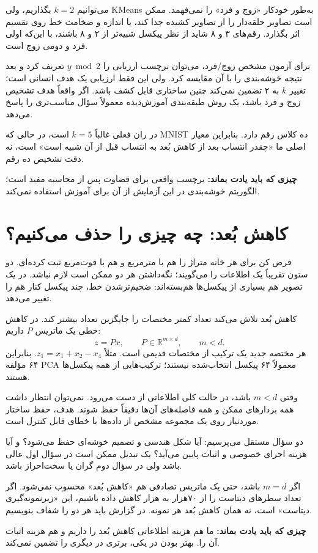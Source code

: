 \documentclass[11pt,a4paper]{article}
\newcommand{\lesson}[1]{\clearpage\section{#1}}
\newcommand{\takeaway}[1]{\par\textbf{چیزی که باید یادت بماند:} #1\par}
\begin{document}
می‌توانیم \(k=2\) بگذاریم، ولی KMeans به‌طور خودکار «زوج و فرد» را نمی‌فهمد. ممکن است تصاویر حلقه‌دار را از تصاویر کشیده جدا کند، یا اندازه و ضخامت خط روی تقسیم اثر بگذارد. رقم‌های ۳ و ۸ شاید از نظر پیکسل شبیه‌تر از ۲ و ۸ باشند، با این‌که اولی فرد و دومی زوج است.

برای آزمون مشخص زوج/فرد، می‌توان برچسب ارزیابی را \(y\bmod2\) تعریف کرد و بعد نتیجه خوشه‌بندی را با آن مقایسه کرد. ولی این فقط ارزیابی یک هدف انسانی است؛ تغییر \(k\) به ۲ تضمین نمی‌کند چنین ساختاری قابل کشف باشد. اگر واقعاً هدف تشخیص زوج و فرد باشد، یک روش طبقه‌بندی آموزش‌دیده معمولاً سؤال مناسب‌تری را پاسخ می‌دهد.

در ران فعلی غالباً \(k=5\) است، در حالی که MNIST ده کلاس رقم دارد. بنابراین معیار اصلی ما «چقدر انتساب بعد از کاهش بُعد به انتساب قبل از آن شبیه است» است، نه دقت تشخیص ده رقم.

\takeaway{برچسب واقعی برای قضاوت پس از محاسبه مفید است؛ الگوریتم خوشه‌بندی در این آزمایش از آن برای آموزش استفاده نمی‌کند.}

\lesson{کاهش بُعد: چه چیزی را حذف می‌کنیم؟}
فرض کن برای هر خانه متراژ را هم با مترمربع و هم با فوت‌مربع ثبت کرده‌ای. دو ستون تقریباً یک اطلاعات را می‌گویند؛ نگه‌داشتن هر دو ممکن است لازم نباشد. در یک تصویر هم بسیاری از پیکسل‌ها هم‌بسته‌اند: ضخیم‌ترشدن خط، چند پیکسل کنار هم را تغییر می‌دهد.

کاهش بُعد تلاش می‌کند تعداد کمتر مختصات را جایگزین تعداد بیشتر کند. در کاهش خطی یک ماتریس \(P\) داریم:
\[
 z=Px,\qquad P\in\mathbb{R}^{m\times d},\qquad m<d.
\]
هر مختصه جدید یک ترکیب از مختصات قدیمی است. مثلاً \(z_1=x_1+x_2-x_4\). بنابراین ۶۴ مؤلفه PCA معمولاً ۶۴ پیکسل انتخاب‌شده نیستند؛ ترکیب‌هایی از همه پیکسل‌ها هستند.

وقتی \(m<d\) باشد، در حالت کلی اطلاعاتی از دست می‌رود. نمی‌توان انتظار داشت همه بردارهای ممکن و همه فاصله‌های آن‌ها دقیقاً حفظ شوند. هدف، حفظ ساختار موردنیاز روی یک مجموعه مشخص از داده‌ها با خطای قابل کنترل است.

دو سؤال مستقل می‌پرسیم: آیا شکل هندسی و تصمیم خوشه‌ای حفظ می‌شود؟ و آیا هزینه اجرای خصوصی و اثبات پایین می‌آید؟ یک تبدیل ممکن است در سؤال اول عالی باشد ولی در سؤال دوم گران یا سخت‌احراز باشد.

اگر \(m=d\) باشد، حتی یک ماتریس تصادفی هم «کاهش بُعد» محسوب نمی‌شود. اگر تعداد سطرهای دیتاست را از ۷۰هزار به هزار کاهش داده باشیم، این «زیرنمونه‌گیری دیتاست» است، نه همان کاهش بُعد هر نمونه. در گزارش باید هر دو را شفاف بنویسیم.

\takeaway{ما هم هزینه اطلاعاتی کاهش بُعد را داریم و هم هزینه اثبات آن را. بهتر بودن در یکی، برتری در دیگری را تضمین نمی‌کند.}
\end{document}
